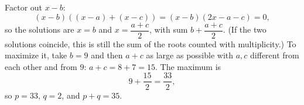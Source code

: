 Factor out $x-b$:
\[(x-b)\left((x-a)+(x-c)\right)=(x-b)(2x-a-c)=0,\]
so the solutions are $x=b$ and $x=\dfrac{a+c}{2}$, with sum $b+\dfrac{a+c}{2}$. (If the two solutions coincide, this is still the sum of the roots counted with multiplicity.) To maximize it, take $b=9$ and then $a+c$ as large as possible with $a,c$ different from each other and from $9$: $a+c=8+7=15$. The maximum is
\[9+\dfrac{15}{2}=\dfrac{33}{2},\]
so $p=33$, $q=2$, and $p+q=\boxed{35}$.
